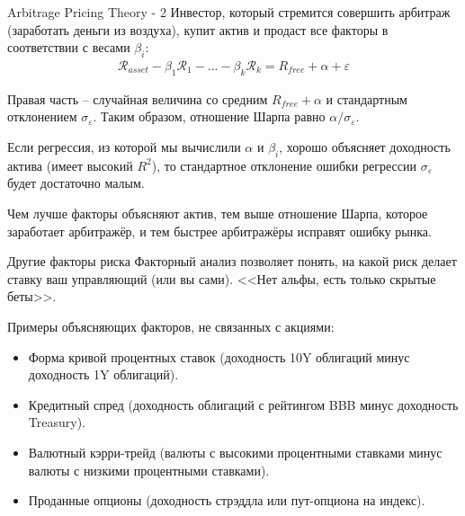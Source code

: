 \documentclass{beamer}
\begin{document}
\begin{frame}{Arbitrage Pricing Theory - 2}
\justify
\justify
Инвестор, который стремится совершить арбитраж (заработать деньги из воздуха), 
купит актив и продаст все факторы в соответствии с весами $\beta_i$:
\begin{align*}
\mathcal{R}_{asset} - \beta_1 \mathcal{R}_{1} - ... - \beta_k \mathcal{R}_k = 
R_{free} + \alpha + \varepsilon
\end{align*}

\justify
Правая часть -- случайная величина со средним $R_{free} + \alpha$ и стандартным 
отклонением $\sigma_{\varepsilon}$. Таким образом, отношение Шарпа равно $
\alpha / \sigma_{\varepsilon}$.

\justify
Если регрессия, из которой мы вычислили $\alpha$ и $\beta_i$, хорошо объясняет 
доходность актива (имеет высокий $R^2$), то стандартное отклонение ошибки 
регрессии $\sigma_\varepsilon$ будет достаточно малым.

\justify
Чем лучше факторы объясняют актив, тем выше отношение Шарпа, которое заработает 
арбитражёр, и тем быстрее арбитражёры исправят ошибку рынка.
\end{frame}



\begin{frame}{Другие факторы риска}
\justify
Факторный анализ позволяет понять, на какой риск делает ставку ваш управляющий 
(или вы сами). <<Нет альфы, есть только скрытые беты>>.

\justify
Примеры объясняющих факторов, не связанных с акциями:
\begin{itemize}
\justifying
\item Форма кривой процентных ставок (доходность 10Y облигаций минус доходность 
1Y облигаций).
\item Кредитный спред (доходность облигаций с рейтингом BBB минус доходность 
Treasury).
\item Валютный кэрри-трейд (валюты с высокими процентными ставками минус валюты 
с низкими процентными ставками).
\item Проданные опционы (доходность стрэддла или пут-опциона на индекс).
\end{itemize}
\end{frame}
\end{document}
